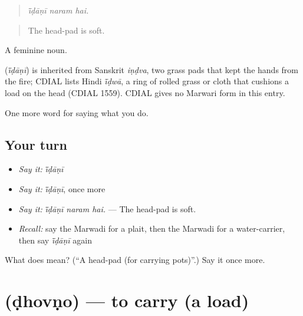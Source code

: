 \begin{quote}
  
\end{quote}

\begin{quote}
\emph{ī̃ḍāṇī naram hai.}
\end{quote}

\begin{quote}
The head-pad is soft.
\end{quote}

A feminine noun.

\begin{cousinweb}
\textbf{} (\emph{ī̃ḍāṇī}) is inherited from Sanskrit \emph{iṇḍva}, two grass pads that kept the hands from the fire; CDIAL lists Hindi \emph{ī̃ḍwā}, a ring of rolled grass or cloth that cushions a load on the head (CDIAL 1559). CDIAL gives no Marwari form in this entry.
\end{cousinweb}

\begin{grammarlens}[title={What you've built}]
One more word for saying what you do.
\end{grammarlens}

\subsection*{Your turn}
\begin{itemize}
\raggedright
  \item \emph{Say it:} \emph{ī̃ḍāṇī}
  \item \emph{Say it:} \emph{ī̃ḍāṇī}, once more
  \item \emph{Say it:} \emph{ī̃ḍāṇī naram hai.} — The head-pad is soft.
  \item \emph{Recall:} say the Marwadi for a plait, then the Marwadi for a water-carrier, then say \emph{ī̃ḍāṇī} again
\end{itemize}

\begin{tcolorbox}[breakable,colback=teal!4,colframe=teal!35!black,title={Before you move on}]
What does  mean? (\textquotedblleft{}A head-pad (for carrying pots)\textquotedblright{}.) Say it once more.
\end{tcolorbox}
\section[\texorpdfstring{\mw{ढोवणो} (ḍhovṇo)}{ढोवणो (ḍhovṇo)}]{ (ḍhovṇo) — to carry (a load)}

